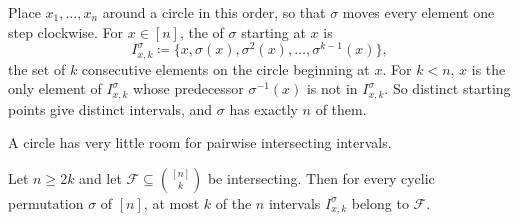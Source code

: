 Place \(x_1, \ldots, x_n\) around a circle in this order, so that \(\sigma\) moves every element one step clockwise. For \(x \in [n]\), the  of \(\sigma\) starting at \(x\) is
\[
    I_{x,k}^\sigma \coloneqq \{x, \sigma(x), \sigma^2(x), \ldots, \sigma^{k-1}(x)\},
\]
the set of \(k\) consecutive elements on the circle beginning at \(x\). For \(k < n\), \(x\) is the only element of \(I_{x,k}^\sigma\) whose predecessor \(\sigma^{-1}(x)\) is not in \(I_{x,k}^\sigma\). So distinct starting points give distinct intervals, and \(\sigma\) has exactly \(n\) of them.
\begin{center}
\end{center}

A circle has very little room for pairwise intersecting intervals.

\begin{lemma}[Katona]\label{lem:katona}
    Let \(n \ge 2k\) and let \(\mathcal{F} \subseteq \binom{[n]}{k}\) be intersecting. Then for every cyclic permutation \(\sigma\) of \([n]\), at most \(k\) of the \(n\) intervals \(I_{x,k}^\sigma\) belong to \(\mathcal{F}\).
\end{lemma}

